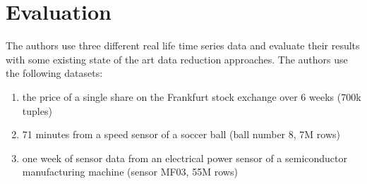 \section{Evaluation}
The authors use three different real life time series data and evaluate their results with some existing state of the art data reduction approaches.
The authors use the following datasets:
\begin{enumerate}
	\item the price of a single
	share on the Frankfurt stock exchange over 6 weeks (700k
	tuples)
	\item 71 minutes from a speed sensor of a soccer ball
	\cite{mutschler2013debs}(ball number 8, 7M rows)
	\item one week of sensor data
	from an electrical power sensor of a semiconductor manufacturing
	machine \cite{jerzak2012debs}(sensor MF03, 55M rows)
\end{enumerate}